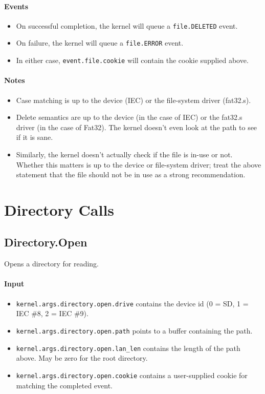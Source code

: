 \paragraph{Events}
\begin{itemize}
\item On successful completion, the kernel will queue a \verb+file.DELETED+ event.
\item On failure, the kernel will queue a \verb+file.ERROR+ event.
\item In either case, \verb+event.file.cookie+ will contain the cookie supplied above.
\end{itemize}

\paragraph{Notes}
\begin{itemize}
\item Case matching is up to the device (IEC) or the file-system driver (fat32.s).
\item Delete semantics are up to the device (in the case of IEC) or the fat32.s driver (in the case of Fat32).  The kernel doesn't even look at the path to see if it is sane. 

\item Similarly, the kernel doesn't actually check if the file is in-use or not.  Whether this matters is up to the device or file-system driver; treat the above statement that the file should not be in use as a strong recommendation. 
\end{itemize}

\section*{Directory Calls}

\subsection*{Directory.Open}
Opens a directory for reading.

\paragraph{Input}
\begin{itemize}
\item \verb+kernel.args.directory.open.drive+ contains the device id (0 = SD, 1 = IEC \#8, 2 = IEC \#9).
\item \verb+kernel.args.directory.open.path+ points to a buffer containing the path.
\item \verb+kernel.args.directory.open.lan_len+ contains the length of the path above.  May be zero for the root directory.
\item \verb+kernel.args.directory.open.cookie+ contains a user-supplied cookie for matching the completed event.
\end{itemize}

